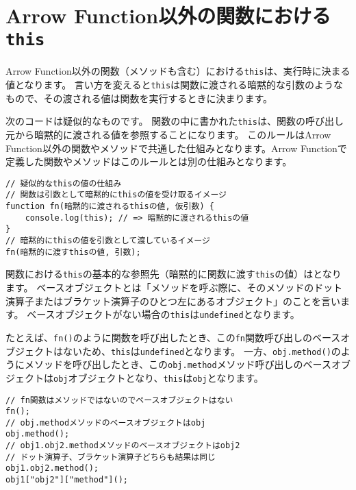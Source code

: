 \hypertarget{function-without-arrow-function-this}{%
\section{\texorpdfstring{Arrow
Function以外の関数における\texttt{this}}{Arrow Function以外の関数におけるthis}}\label{function-without-arrow-function-this}}

Arrow
Function以外の関数（メソッドも含む）における\texttt{this}は、実行時に決まる値となります。
言い方を変えると\texttt{this}は関数に渡される暗黙的な引数のようなもので、その渡される値は関数を実行するときに決まります。

次のコードは疑似的なものです。
関数の中に書かれた\texttt{this}は、関数の呼び出し元から暗黙的に渡される値を参照することになります。
このルールはArrow
Function以外の関数やメソッドで共通した仕組みとなります。Arrow
Functionで定義した関数やメソッドはこのルールとは別の仕組みとなります。

\begin{lstlisting}
// 疑似的なthisの値の仕組み
// 関数は引数として暗黙的にthisの値を受け取るイメージ
function fn(暗黙的に渡されるthisの値, 仮引数) {
    console.log(this); // => 暗黙的に渡されるthisの値
}
// 暗黙的にthisの値を引数として渡しているイメージ
fn(暗黙的に渡すthisの値, 引数);
\end{lstlisting}

関数における\texttt{this}の基本的な参照先（暗黙的に関数に渡す\texttt{this}の値）は\textbf{}となります。
ベースオブジェクトとは「メソッドを呼ぶ際に、そのメソッドのドット演算子またはブラケット演算子のひとつ左にあるオブジェクト」のことを言います。
ベースオブジェクトがない場合の\texttt{this}は\texttt{undefined}となります。

たとえば、\texttt{fn()}のように関数を呼び出したとき、この\texttt{fn}関数呼び出しのベースオブジェクトはないため、\texttt{this}は\texttt{undefined}となります。
一方、\texttt{obj.method()}のようにメソッドを呼び出したとき、この\texttt{obj.method}メソッド呼び出しのベースオブジェクトは\texttt{obj}オブジェクトとなり、\texttt{this}は\texttt{obj}となります。

\begin{lstlisting}
// fn関数はメソッドではないのでベースオブジェクトはない
fn();
// obj.methodメソッドのベースオブジェクトはobj
obj.method();
// obj1.obj2.methodメソッドのベースオブジェクトはobj2
// ドット演算子、ブラケット演算子どちらも結果は同じ
obj1.obj2.method();
obj1["obj2"]["method"]();
\end{lstlisting}


